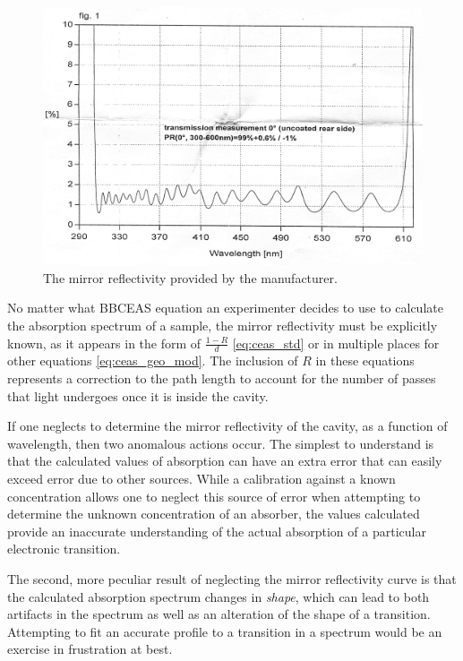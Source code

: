 \begin{figure}
\begin{center}
\includegraphics[width=\textwidth]{figures/mirrors.jpg}
\end{center}
\caption{The mirror reflectivity provided by the manufacturer.}
\label{fig:mirror}
\end{figure}

No matter what \ac{BBCEAS} equation an experimenter decides to use to calculate
the absorption spectrum of a sample, the mirror reflectivity must be explicitly
known, as it appears in the form of $\tfrac{1-R}{d}$ \eqref{eq:ceas_std} or in
multiple places for other equations \eqref{eq:ceas_geo_mod}. The inclusion of
$R$ in these equations represents a correction to the path length to account
for the number of passes that light undergoes once it is inside the cavity.

If one neglects to determine the mirror reflectivity of the cavity, as a
function of wavelength, then two anomalous actions occur. The simplest to
understand is that the calculated values of absorption can have an extra error
that can easily exceed error due to other sources. While a calibration against
a known concentration allows one to neglect this source of error when
attempting to determine the unknown concentration of an absorber, the values
calculated provide an inaccurate understanding of the actual absorption of a
particular electronic transition.

The second, more peculiar result of neglecting the mirror reflectivity curve is
that the calculated absorption spectrum changes in \emph{shape}, which  can
lead to both artifacts in the spectrum as well as an alteration of the shape of
a transition. Attempting to fit an accurate profile to a transition in a
spectrum would be an exercise in frustration at best.

